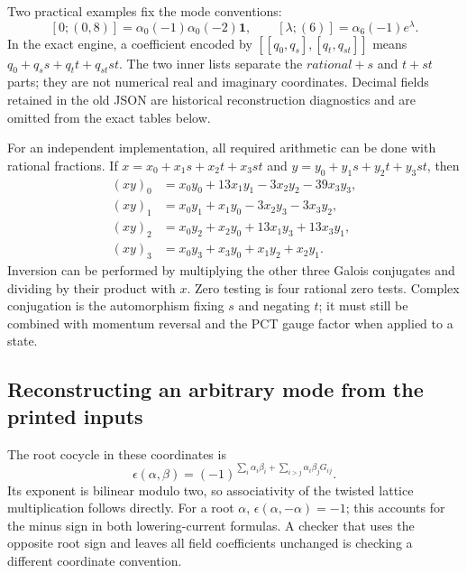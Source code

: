 Two practical examples fix the mode conventions:
\[
 [0;(0,8)]=\alpha_0(-1)\alpha_0(-2)\mathbf1,
 \qquad [\lambda;(6)]=\alpha_6(-1)e^\lambda.
\]
In the exact engine, a coefficient encoded by
$[[q_0,q_s],[q_t,q_{st}]]$ means
$q_0+q_ss+q_tt+q_{st}st$. The two inner lists separate the
$rational+s$ and $t+st$ parts; they are not numerical real and
imaginary coordinates. Decimal fields retained in the old JSON are
historical reconstruction diagnostics and are omitted from the exact
tables below.

For an independent implementation, all required arithmetic can be done
with rational fractions. If $x=x_0+x_1s+x_2t+x_3st$ and
$y=y_0+y_1s+y_2t+y_3st$, then
\begin{align*}
(xy)_0&=x_0y_0+13x_1y_1-3x_2y_2-39x_3y_3,\\
(xy)_1&=x_0y_1+x_1y_0-3x_2y_3-3x_3y_2,\\
(xy)_2&=x_0y_2+x_2y_0+13x_1y_3+13x_3y_1,\\
(xy)_3&=x_0y_3+x_3y_0+x_1y_2+x_2y_1.
\end{align*}
Inversion can be performed by multiplying the other three Galois
conjugates and dividing by their product with $x$. Zero testing is four
rational zero tests. Complex conjugation is the automorphism fixing $s$
and negating $t$; it must still be combined with momentum reversal and
the PCT gauge factor when applied to a state.

\subsection{Reconstructing an arbitrary mode from the printed inputs}
\label{expfinite:mode-engine}

The root cocycle in these coordinates is
\[
 \epsilon(\alpha,\beta)=(-1)^{
 \sum_i\alpha_i\beta_i+\sum_{i>j}\alpha_i\beta_jG_{ij}}.
\]
Its exponent is bilinear modulo two, so associativity of the twisted
lattice multiplication follows directly. For a root $\alpha$,
$\epsilon(\alpha,-\alpha)=-1$; this accounts for the minus sign in
both lowering-current formulas. A checker that uses the opposite root
sign and leaves all field coefficients unchanged is checking a different
coordinate convention.

